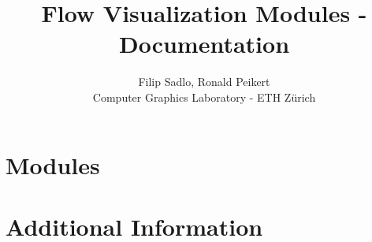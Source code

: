 \documentclass[12pt]{book}
\begin{document}
\title{Flow Visualization Modules - Documentation}
\author{Filip Sadlo, Ronald Peikert\\ Computer Graphics Laboratory - ETH Z\"urich}
\maketitle
\clearemptydoublepage
{}
\setcounter{page}{1}
\tableofcontents
\clearemptydoublepage
{}



\chapter{Modules}











\appendix



\chapter{Additional Information}



\end{document}
